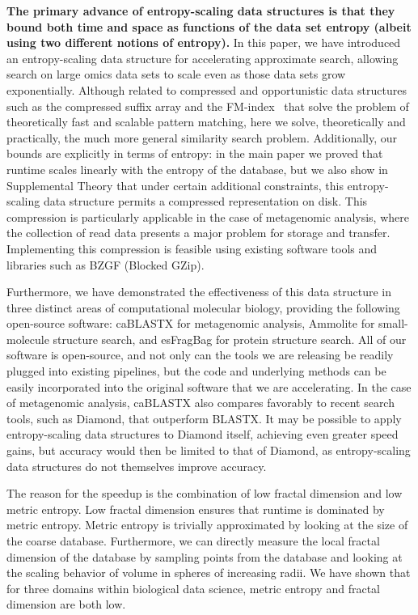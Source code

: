 \documentclass[review,preprint,12pt]{elsarticle}
\renewcommand{\cite}{\citep} %
\theoremstyle{definition}
\theoremstyle{remark}
\numberwithin{equation}{section}
\begin{document}
\textbf{The primary advance of entropy-scaling data structures is that they bound both time and space as functions of the data set entropy (albeit using two different notions of entropy).}
In this paper, we have introduced an entropy-scaling data structure for accelerating approximate search,
allowing search on large omics data sets to scale even as those data sets grow exponentially.
Although related to compressed and opportunistic data structures such as the compressed suffix array and the FM-index~\cite{grossi2005compressed, ferragina2000opportunistic} that solve the problem of 
theoretically fast and scalable pattern matching,
here we solve, theoretically and practically, the much more general similarity 
search problem.
Additionally, our bounds are explicitly in terms of entropy: in the main paper we proved that runtime scales linearly with the entropy of the 
database, but we also show in Supplemental Theory that under certain additional constraints, this entropy-scaling data structure permits a compressed 
representation on disk.
This compression is particularly applicable in the case of metagenomic analysis, where the collection of 
read data presents a major problem for storage and transfer.
Implementing this compression is feasible using existing software tools and libraries such as BZGF (Blocked GZip).

Furthermore, we have demonstrated the effectiveness of this data structure in
three distinct areas of computational molecular biology, providing the
following open-source software: caBLASTX for metagenomic analysis, Ammolite for
small-molecule structure search, and esFragBag for protein structure search.
All of our software is open-source, and not only can the tools we are 
releasing be readily plugged into existing pipelines, but the code and 
underlying methods can be easily incorporated into the original 
software that we are accelerating.
In the case of metagenomic analysis, caBLASTX also compares favorably to recent 
search tools, such as Diamond, that outperform BLASTX.
It may be possible to apply entropy-scaling data
structures to Diamond itself, achieving even greater speed gains, but
accuracy would then be limited to that of Diamond,
as entropy-scaling data structures do not themselves 
improve accuracy.

The reason for the speedup is the combination of low fractal dimension and low metric entropy.
Low fractal dimension ensures that runtime is dominated by metric entropy.
Metric entropy is trivially approximated by looking at the size of the coarse database.
Furthermore, we can directly measure the local fractal dimension of the database by sampling points from the database and looking at the scaling behavior of volume in spheres of increasing radii.
We have shown that for three domains within biological data science, metric entropy and fractal dimension are both low.
\end{document}
